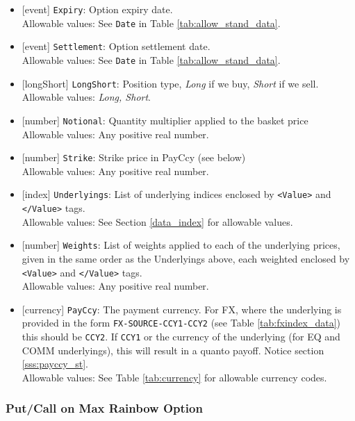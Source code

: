 \begin{itemize}
    \item{}[event] \lstinline!Expiry!: Option expiry date. \\
    Allowable values: See \lstinline!Date! in Table \ref{tab:allow_stand_data}.
    \item{}[event] \lstinline!Settlement!: Option settlement date. \\
    Allowable values: See \lstinline!Date! in Table \ref{tab:allow_stand_data}.
    \item{}[longShort] \lstinline!LongShort!: Position type,
          {\em Long} if we buy, {\em Short} if we sell.\\
    Allowable values: \emph{Long, Short}.
        \item{}[number] \lstinline!Notional!: Quantity multiplier applied to the
          basket price \\
          Allowable values: Any positive real number.
        \item{}[number] \lstinline!Strike!: Strike price in PayCcy (see
          below) \\
          Allowable values: Any positive real number.
    \item{}[index] \lstinline!Underlyings!: List of underlying indices
          enclosed by {\tt <Value>} and {\tt </Value>} tags. \\
          Allowable values: See Section \ref{data_index} for allowable values.
    \item{}[number] \lstinline!Weights!: List of weights applied to each of
          the underlying prices, given in the same order as
          the Underlyings above, each weighted enclosed by {\tt <Value>} and {\tt </Value>} tags.\\
          Allowable values: Any positive real number.
    \item{}[currency] \lstinline!PayCcy!: The payment currency. For FX, where the underlying is provided
      in the form \lstinline!FX-SOURCE-CCY1-CCY2! (see Table \ref{tab:fxindex_data}) this should
      be \lstinline!CCY2!. If \lstinline!CCY1! or the currency of the underlying (for EQ and
      COMM underlyings), this will result in a quanto payoff. Notice section \ref{sss:payccy_st}. \\
        Allowable values: See Table \ref{tab:currency} for allowable currency codes.
\end{itemize}

\subsubsection*{Put/Call on Max Rainbow Option}

